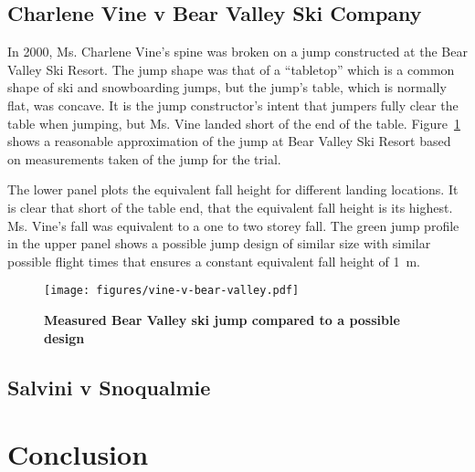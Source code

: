 \documentclass{article}
\begin{document}
\subsection{Charlene Vine v Bear Valley Ski Company}
%
In 2000, Ms. Charlene Vine's spine was broken on a jump constructed at the Bear Valley
Ski Resort. The jump shape was that of a ``tabletop'' which is a common shape
of ski and snowboarding jumps, but the jump's table, which is normally flat,
was concave. It is the jump constructor's intent that jumpers fully clear the
table when jumping, but Ms. Vine landed short of the end of the table.
Figure~\ref{fig:vine-v-bear-valley} shows a reasonable approximation of the
jump at Bear Valley Ski Resort based on measurements taken of the jump for the
trial.

The lower panel plots the equivalent fall height for different landing
locations. It is clear that short of the table end, that the equivalent fall
height is its highest. Ms. Vine's fall was equivalent to a one to two storey
fall. The green jump profile in the upper panel shows a possible jump design of
similar size with similar possible flight times that ensures a constant
equivalent fall height of 1~\si{\meter}.
%
\begin{figure}
  \centering
  \texttt{[image: figures/vine-v-bear-valley.pdf]}
  \caption{\textbf{Measured Bear Valley ski jump compared to a possible design}}
  \label{fig:vine-v-bear-valley}
\end{figure}

\subsection{Salvini v Snoqualmie}

\section{Conclusion}
%


\end{document}
